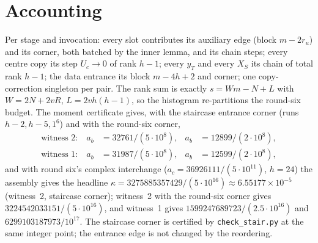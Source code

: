 \documentclass[11pt]{article}
\theoremstyle{remark}\newtheorem*{remark}{Remark}
\begin{document}
\section{Accounting}
Per stage and invocation: every slot contributes its auxiliary edge (block $m-2r_u$) and its corner, both batched
by the inner lemma, and its chain steps; every centre copy its step $U_c\to0$ of rank $h-1$; every $y_T$ and every
$X_S$ its chain of total rank $h-1$; the data entrance its block $m-4h+2$ and corner; one copy-correction singleton per
pair. The rank sum is exactly $s=Wm-N+L$ with $W=2N+2vR$, $L=2vh(h-1)$, so the histogram re-partitions the round-six
budget. The moment certificate gives, with the staircase entrance corner (runs $h-2,h-5,1^6$) and with the round-six
corner,
\begin{align*}
 \text{witness 2:}\quad a_b&=32761/(5\cdot10^8), &a_b&=12899/(2\cdot10^8),\\
 \text{witness 1:}\quad a_b&=31987/(5\cdot10^8), &a_b&=12599/(2\cdot10^8),
\end{align*}
and with round six's complex interchange ($a_c=36926111/(5\cdot10^{11})$, $h=24$) the assembly gives the headline
$\kappa=3275885357429/(5\cdot10^{16})\approx6.55177\times10^{-5}$ (witness~2, staircase corner); witness~2 with the
round-six corner gives $3224542033151/(5\cdot10^{16})$, and witness~1 gives $1599247689723/(2.5\cdot10^{16})$ and
$6299103187973/10^{17}$. The staircase corner is certified by \texttt{check\_stair.py} at the same integer point;
the entrance edge is not changed by the reordering.
\end{document}
